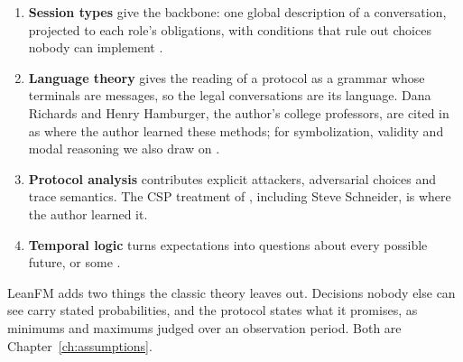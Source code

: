 \begin{enumerate}[label=\arabic*.]
  \item \textbf{Session types} give the backbone: one global description of a
        conversation, projected to each role's obligations, with conditions that
        rule out choices nobody can implement
        \citep{honda1993types,honda2008multiparty,yoshida2013scribble}.
  \item \textbf{Language theory} gives the reading of a protocol as a grammar
        whose terminals are messages, so the legal conversations are its
        language. Dana Richards and Henry Hamburger, the author's college
        professors, are cited in \citet{richards2017logic} as where the author
        learned these methods; for symbolization, validity and modal reasoning
        we also draw on \citet{gensler2017introduction}.
  \item \textbf{Protocol analysis} contributes explicit attackers, adversarial
        choices and trace semantics. The CSP treatment of
        \citet{ryan2001modelling}, including Steve Schneider, is where the author
        learned it.
  \item \textbf{Temporal logic} turns expectations into questions about every
        possible future, or some \citep{clarke1986automatic}.
\end{enumerate}

LeanFM adds two things the classic theory leaves out. Decisions nobody else can
see carry stated probabilities, and the protocol states what it promises, as
minimums and maximums judged over an observation period. Both are
Chapter~\ref{ch:assumptions}.
